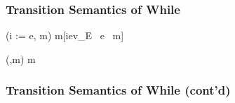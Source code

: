 \documentclass{beamer}
\begin{document}
\frame
{
    \frametitle{Transition Semantics of While}

\begin{minipage}{1in}
\begin{haskell}
(i := e, m) \ra m[i\mapsto ev_E ~e ~m]
\end{haskell}
\end{minipage}
\begin{minipage}{1in}
\begin{haskell}
(,m) \ra m
\end{haskell}
\end{minipage}

\begin{minipage}{1in}
\begin{haskell}
\end{haskell}
\end{minipage}
\begin{minipage}{1in}
\begin{haskell}
\end{haskell}
\end{minipage}

\begin{center}
\begin{minipage}{1in}
\begin{haskell}
\end{haskell}
\end{minipage}
\begin{minipage}{1in}
\begin{haskell}
\end{haskell}
\end{minipage}
\end{center}

}

\frame
{
    \frametitle{Transition Semantics of While (cont'd)}

\begin{center}
\begin{haskell}
\end{haskell}
\end{center}

\begin{center}
\begin{haskell}
\end{haskell}
\end{center}

}
\end{document}
